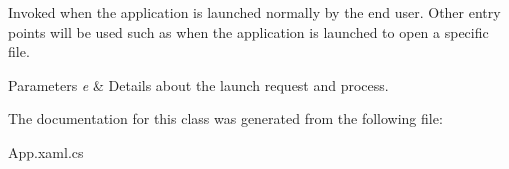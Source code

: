 Invoked when the application is launched normally by the end user. Other entry points will be used such as when the application is launched to open a specific file. 


\begin{DoxyParams}{Parameters}
{\em e} & Details about the launch request and process.\\
\hline
\end{DoxyParams}


The documentation for this class was generated from the following file\+:\begin{DoxyCompactItemize}
\item 
App.\+xaml.\+cs\end{DoxyCompactItemize}
